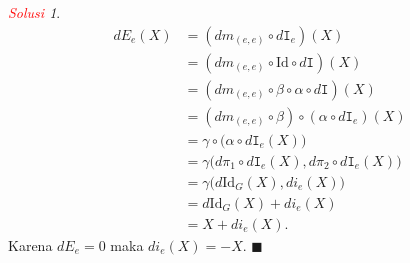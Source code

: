 \documentclass[11pt]{article}
\theoremstyle{definition}
\theoremstyle{remark}
\newtheorem*{solution}{\textcolor{red}{Solusi}}
\begin{document}
\begin{solution}
\begin{align*}
    dE_e(X) &= ( dm_{(e,e)} \circ d\mathtt{I}_e ) (X)  \\
    &= (dm_{(e,e)} \circ \text{Id} \circ d\mathtt{I} )(X) \\ 
    &= (dm_{(e,e)} \circ \beta \circ \alpha \circ d\mathtt{I} )(X) \\
    &= (dm_{(e,e)} \circ \beta ) \circ (\alpha \circ d\mathtt{I}_e) (X) \\
    &= \gamma \circ \big( \alpha \circ d\mathtt{I}_e(X) \big) \\
    &= \gamma \big( d\pi_1 \circ d\mathtt{I}_e (X), d\pi_2 \circ d\mathtt{I}_e (X) \big) \\
    &= \gamma \big( d\text{Id}_G(X), di_e(X) \big) \\
    &=  d\text{Id}_G(X) + di_e(X) \\
    &=  X + di_e(X).
\end{align*}
Karena $dE_e=0$ maka $di_e(X) = -X$. $\blacksquare$
\end{solution}
\end{document}
